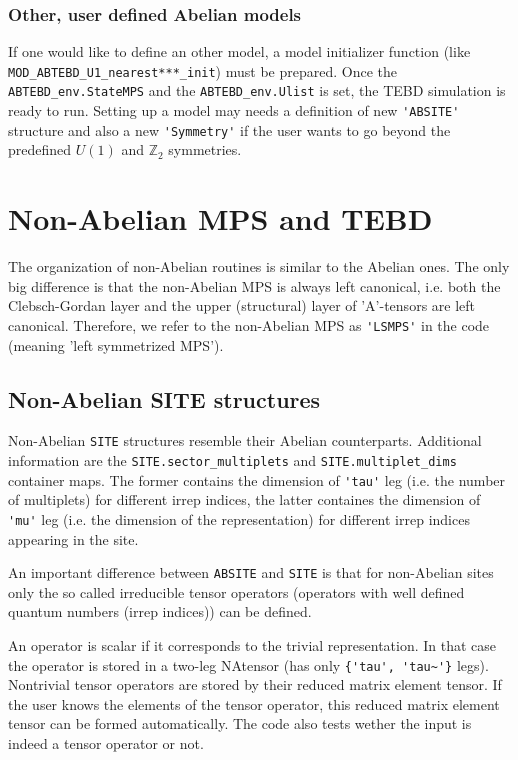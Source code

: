 \documentclass[aps,prb,twocolumn,showpacs,preprintnumbers,amsmath,amssymb, superscriptaddressm, nofootinbib]{revtex4-2}   %
\begin{document}
\subsubsection{Other, user defined Abelian models}
If one would like to define an other model, a model initializer function (like \verb|MOD_ABTEBD_U1_nearest***_init|) must be prepared. Once the \verb|ABTEBD_env.StateMPS| and the \verb|ABTEBD_env.Ulist| is set, the TEBD simulation is ready to run. Setting up a model may needs a definition of new \verb|'ABSITE'| structure and also a new \verb|'Symmetry'| if the user wants to go beyond the predefined $U(1)$ and $\mathbb{Z}_2$ symmetries.


\section{Non-Abelian MPS and TEBD}
The organization of non-Abelian routines is similar to the Abelian ones. The only big difference is that the non-Abelian MPS is always left canonical, i.e. both the Clebsch-Gordan layer and the upper (structural) layer of 'A'-tensors are left canonical. Therefore, we refer to the non-Abelian MPS as \verb|'LSMPS'| in the code (meaning 'left symmetrized MPS').

\subsection{Non-Abelian SITE structures}
Non-Abelian \verb|SITE| structures resemble their Abelian counterparts. 
Additional information are the \verb|SITE.sector_multiplets| and \verb|SITE.multiplet_dims| container maps. The former contains the dimension of \verb|'tau'| leg (i.e. the number of multiplets) for different irrep indices, the latter containes the dimension of \verb|'mu'| leg (i.e. the dimension of the representation) for different irrep indices appearing in the site. 

An important difference between \verb|ABSITE| and \verb|SITE| is that for non-Abelian sites only the so called irreducible tensor operators (operators with well defined quantum numbers (irrep indices)) can be defined. 

An operator is scalar if it corresponds to the trivial representation. In that case the operator is stored in a two-leg NAtensor (has only \verb|{'tau', 'tau~'}| legs). Nontrivial tensor operators are stored by their reduced matrix element tensor. If the user knows the elements of the tensor operator, this reduced matrix element tensor can be formed automatically. The code also tests wether the input is indeed a tensor operator or not. 
\end{document}
